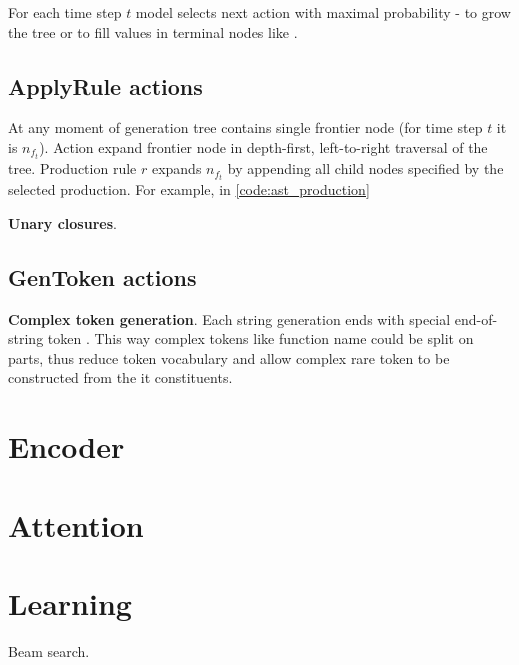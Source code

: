 For each time step $t$ model selects next action with maximal probability -  to grow the tree or  to fill values in terminal nodes like . 

\subsection{ApplyRule actions}

At any moment of generation tree contains single frontier node (for time step $t$ it is $n_{f_t}$). Action  expand frontier node in depth-first, left-to-right traversal of the tree. Production rule $r$ expands $n_{f_t}$ by appending all child nodes specified by the selected production. For example, in \ref{code:ast_production}

\textbf{Unary closures}. 

\subsection{GenToken actions}





\textbf{Complex token generation}. Each string generation ends with special end-of-string token . This way complex tokens like function name  could be split on parts, thus reduce token vocabulary and allow complex rare token to be constructed from the it constituents.


\section{Encoder}


\section{Attention}

\section{Learning}
Beam search.